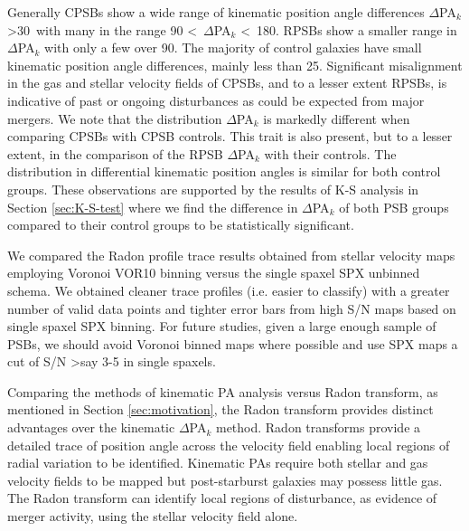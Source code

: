Generally CPSBs show a wide range of kinematic position angle differences $\Delta$PA$_{k}$ \textgreater 30\textdegree\ with many in the range 90 \textless\ $\Delta$PA$_{k}$ \textless\ 180\textdegree. RPSBs show a smaller range in $\Delta$PA$_{k}$ with only a few over 90\textdegree. The majority of control galaxies have small kinematic position angle differences, mainly less than 25\textdegree. Significant misalignment in the gas and stellar velocity fields of CPSBs, and to a lesser extent RPSBs, is indicative of past or ongoing disturbances as could be expected from major mergers.
We note that the distribution $\Delta$PA$_{k}$ is markedly different when comparing CPSBs with CPSB controls. This trait is also present, but to a lesser extent, in the comparison of the RPSB $\Delta$PA$_{k}$ with their controls. The distribution in differential kinematic position angles is similar for both control groups. These observations are supported by the results of K-S analysis in Section \ref{sec:K-S-test} where we find the difference in $\Delta$PA$_{k}$ of both PSB groups compared to their control groups to be statistically significant. 

We compared the Radon profile trace results obtained from stellar velocity maps employing Voronoi VOR10 binning versus the single spaxel SPX unbinned schema. We obtained cleaner trace profiles (i.e. easier to classify) with a greater number of valid data points and tighter error bars from high S/N maps based on single spaxel SPX binning. For future studies, given a large enough sample of PSBs, we should avoid Voronoi binned maps where possible and use SPX maps a cut of S/N \textgreater say 3-5 in single spaxels.

Comparing the methods of kinematic PA analysis versus Radon transform, as mentioned in Section \ref{sec:motivation}, the Radon transform provides distinct advantages over the kinematic $\Delta$PA$_{k}$ method. Radon transforms provide a detailed trace of position angle across the velocity field enabling local regions of radial variation to be identified. Kinematic PAs require both stellar and gas velocity fields to be mapped but post-starburst galaxies may possess little gas. The Radon transform can identify local regions of disturbance, as evidence of merger activity, using the stellar velocity field alone.

